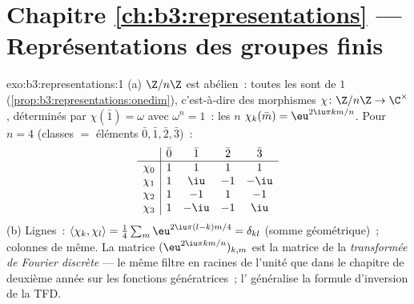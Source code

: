 \section*{Chapitre \ref{ch:b3:representations} --- Représentations
des groupes finis}

\begin{solution}{exo:b3:representations:1}
(a) $\Z/n\Z$ est abélien~: toutes les  sont de 
$1$ (\cref{prop:b3:representations:onedim}), c'est-à-dire des
morphismes $\chi \colon \Z/n\Z \to \C^\times$, déterminés par
$\chi(\bar 1) = \omega$ avec $\omega^n = 1$~: les $n$ 
$\chi_k(\bar m) = \eu^{2\iu\pi km/n}$. Pour $n = 4$ (classes $=$
éléments $\bar0,\bar1,\bar2,\bar3$)~:
\[
\begin{array}{c|cccc}
& \bar0 & \bar1 & \bar2 & \bar3\\
\hline
\chi_0 & 1 & 1 & 1 & 1\\
\chi_1 & 1 & \iu & -1 & -\iu\\
\chi_2 & 1 & -1 & 1 & -1\\
\chi_3 & 1 & -\iu & -1 & \iu
\end{array}
\]
(b) Lignes~: $\langle\chi_k,\chi_l\rangle = \frac14\sum_m
\eu^{2\iu\pi(l-k)m/4} = \delta_{kl}$ (somme géométrique)~; colonnes
de même. La matrice $(\eu^{2\iu\pi km/n})_{k,m}$ est la matrice de
la \emph{transformée de Fourier discrète} --- le même filtre en
racines de l'unité que dans le chapitre de deuxième année sur les
fonctions génératrices~; l' généralise la
formule d'inversion de la TFD.
\end{solution}


